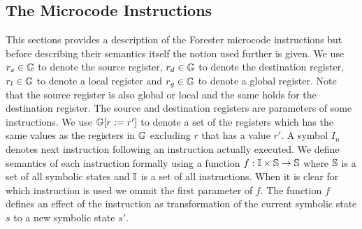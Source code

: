 \subsection{The Microcode Instructions}
\label{subsec:microinstr}

This sections provides a description of the Forester microcode instructions
but before describing their semantics itself the notion used further is given.
We use $r_s \in \mathbb{G}$ to denote the source register,
$r_d \in \mathbb{G}$ to denote the destination register,
$r_l \in \mathbb{G}$ to denote a local register and
$r_g \in \mathbb{G}$ to denote a global register.
Note that the source register is also global or local and the same holds for the destination register.
The source and destination registers are parameters of some instructions.
We use $\mathbb{G} [r := r']$ to denote a set of the registers which has the same values as
the registers in $\mathbb{G}$ excluding $r$ that has a value $r'$.
A symbol $I_n$ denotes next instruction following an instruction actually executed.
We define semantics of each instruction formally using a function 
$f: \mathbb{I} \times \mathbb{S} \rightarrow \mathbb{S}$
where $\mathbb{S}$ is a set of all symbolic states and $\mathbb{I}$ is a set of all instructions.
When it is clear for which instruction is used we ommit the first parameter of $f$.
The function $f$ defines an effect of the instruction as transformation of
the current symbolic state $s$ to a new symbolic state $s'$.

